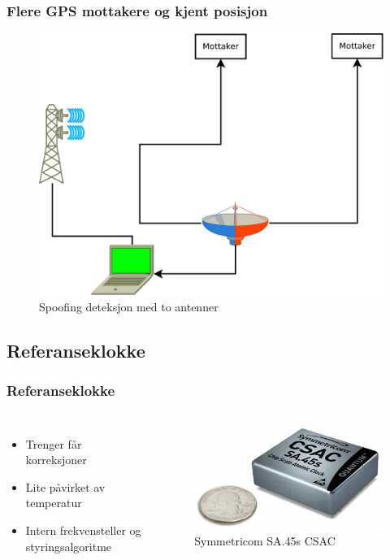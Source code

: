 \documentclass[xcolor=table]{beamer}
\begin{document}
\begin{frame} 
  \frametitle{Flere GPS mottakere og kjent posisjon}
  \begin{figure}
    \includegraphics[scale=0.2]{thesis/graphics/toantenner_2.pdf}
    \caption{Spoofing deteksjon med to antenner}
  \end{figure}
\end{frame}

\subsection{Referanseklokke}
\begin{frame}
  \frametitle{Referanseklokke}
  \begin{columns}
    \begin{itemize}
      \item Trenger får korreksjoner
      \item Lite påvirket av temperatur
      \item Intern frekvensteller og styringsalgoritme
    \end{itemize}
      \begin{figure}
        \includegraphics[scale=0.2]{thesis/graphics/csac.jpg}
      \caption{Symmetricom SA.45s CSAC}
    \end{figure}
  \end{columns}
\end{frame}
\end{document}
